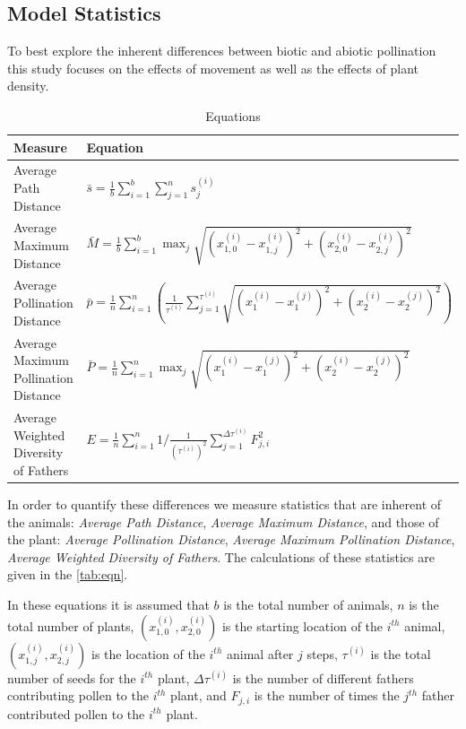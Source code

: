 \subsection{Model Statistics}
  To best explore the inherent differences between biotic and abiotic pollination this study focuses
  on the effects of movement as well as the effects of plant density.  
  \begin{table}[h]
  \setlength{\extrarowheight}{10pt}
    {\footnotesize
    \begin{tabular}{|l|l|}
      \hline
      Measure & Equation \\[8pt] \hline   \hline
      Average Path Distance & $\bar{s} = \frac{1}{b} \sum_{i=1}^b \sum_{j=1}^n s^{\left(i\right)}_j$ \\[8pt] \hline
      Average Maximum Distance & $ \bar{M} = \frac{1}{b} \sum_{i=1}^b \max_j \sqrt{\left(x^{\left(i\right)}_{1,0}
    - x^{\left(i\right)}_{1,j}\right)^2 +
          \left(x^{\left(i\right)}_{2,0} -
    x^{\left(i\right)}_{2,j}\right)^2}  $ \\[8pt] \hline
      Average Pollination Distance & $ \bar{p} = \frac{1}{n} \sum_{i=1}^{n} \left(
    \frac{1}{\tau^{\left(i\right)}} \sum_{j=1}^{\tau^{\left(i\right)}}
    \sqrt{\left(x^{\left(i\right)}_1 -
    x^{\left(j\right)}_1\right)^2 + \left(x^{\left(i\right)}_2 -
        x^{\left(j\right)}_2\right)^2}
        \right)  $ \\[12pt]  \hline
      Average Maximum Pollination Distance & $ \bar{P} = \frac{1}{n} \sum_{i=1}^{n} \max_j \sqrt{\left(x^{\left(i\right)}_1 -
    x^{\left(j\right)}_1\right)^2 + \left(x^{\left(i\right)}_2 -
        x^{\left(j\right)}_2\right)^2}$ \\[8pt]  \hline
      Average Weighted Diversity of Fathers & $ E = \frac{1}{n} \sum_{i=1}^n 1/\frac{1}{\left(\tau^{\left(i\right)}\right)^2}
      \sum_{j=1}^{\Delta\tau^{\left(i\right)}} F^2_{j,i} $ \\[8pt]
      \hline
    \end{tabular}
  }
    \caption{Equations}
    \label{tab:eqn}
  \end{table}
  In order to quantify these differences we measure statistics that are inherent of the animals:
  \emph{Average Path Distance}, \emph{Average Maximum Distance}, and those of the plant:
  \emph{Average Pollination Distance}, \emph{Average Maximum Pollination Distance}, \emph{Average
  Weighted Diversity of Fathers}.  The calculations of these statistics are given in the
  \autoref{tab:eqn}.

  In these equations it is assumed that $b$ is the total number of animals, $n$ is the total number
  of plants, $(x_{1,0}^{(i)},x_{2,0}^{(i)})$ is the starting location of the $i^{th}$ animal,
  $(x_{1,j}^{(i)},x_{2,j}^{(i)})$ is the location of the $i^{th}$ animal after $j$ steps,
  $\tau^{(i)}$ is the total number of seeds for the $i^{th}$ plant, $\Delta\tau^{(i)}$ is the number
  of different fathers contributing pollen to the $i^{th}$ plant, and $F_{j,i}$ is the number of
  times the $j^{th}$ father contributed pollen to the $i^{th}$ plant.

